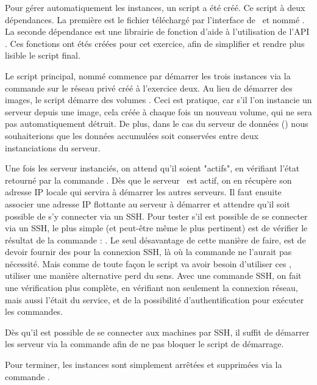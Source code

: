 \documentclass[french]{msereport}
\newcommand{\switchengines}{\brand{SWITCH Engines}}
\newcommand{\mongodb}{\brand{MongoDB}}
\begin{document}
		Pour gérer automatiquement les instances, un script  a été créé. Ce script à deux dépendances. La première est le fichier téléchargé par l'interface de \switchengines\ et nommé . La seconde dépendance est une librairie de fonction d'aide à l'utilisation de l'\acs{API} . Ces fonctions ont étés créées pour cet exercice, afin de simplifier et rendre plus lisible le script final.

		Le script principal, nommé  commence par démarrer les trois instances via la commande  sur le réseau privé créé à l'exercice deux. Au lieu de démarrer des images, le script démarre des volumes . Ceci est pratique, car s'il l'on instancie un serveur depuis une image, cela créée à chaque fois un nouveau volume, qui ne sera pas automatiquement détruit. De plus, dans le cas du serveur de données (\mongodb) nous souhaiterions que les données accumulées soit conservées entre deux instanciations du serveur.

		Une fois les serveur instanciés, on attend qu'il soient "actifs", en vérifiant l'état retourné par la commande . Dès que le serveur \mongodb\ est actif, on en récupère son adresse \acs{IP} locale qui servira à démarrer les autres serveurs. Il faut ensuite associer une adresse \acs{IP} flottante au serveur à démarrer et attendre qu'il soit possible de s'y connecter via un \acs{SSH}. Pour tester s'il est possible de se connecter via un \acs{SSH}, le plus simple (et peut-être même le plus pertinent) est de vérifier le résultat de la commande : . Le seul désavantage de cette manière de faire, est de devoir fournir des  pour la connexion \acs{SSH}, là où la commande  ne l'aurait pas nécessité. Mais comme de toute façon le script va avoir besoin d'utiliser ces , utiliser une manière alternative perd du sens. Avec une commande \acs{SSH}, on fait une vérification plus complète, en vérifiant non seulement la connexion réseau, mais aussi l'était du service, et de la possibilité d'authentification pour exécuter les commandes.

		Dès qu'il est possible de se connecter aux machines par \acs{SSH}, il suffit de démarrer les serveur via la commande  afin de ne pas bloquer le script de démarrage.

		Pour terminer, les instances sont simplement arrêtées et supprimées via la commande .
\end{document}
